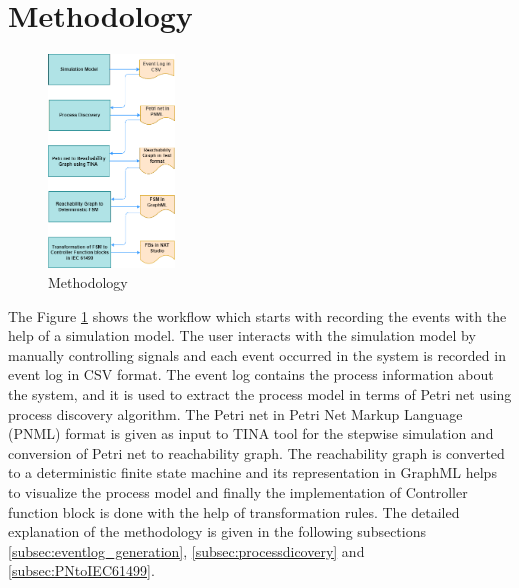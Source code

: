 \documentclass[conference]{IEEEtran}
\begin{document}
\section{Methodology}
\label{sec:methodology}

\begin{figure}[!t]
	\centering
	\includegraphics[width=0.3\textwidth]{images/PN2ControllerFlow.png}
	\caption{Methodology}
	\label{Methodology}
\end{figure}

The Figure \ref{Methodology} shows the workflow which starts with recording the events with the help of a simulation model. The user interacts with the simulation model by manually controlling signals and each event occurred in the system is recorded in event log in CSV format. The event log contains the process information about the system, and it is used to extract the process model in terms of Petri net \cite{petri1962} using process discovery algorithm. The Petri net in Petri Net Markup Language (PNML) format is given as input to TINA \cite{berthomieu2004tool} tool for the stepwise simulation and conversion of Petri net to reachability graph. The reachability graph is converted to a deterministic finite state machine and its representation in GraphML helps to visualize the process model and finally the implementation of Controller function block is done with the help of transformation rules. The detailed explanation of the methodology is given in the following subsections  \ref{subsec:eventlog_generation}, \ref{subsec:processdicovery} and \ref{subsec:PNtoIEC61499}.
\end{document}
